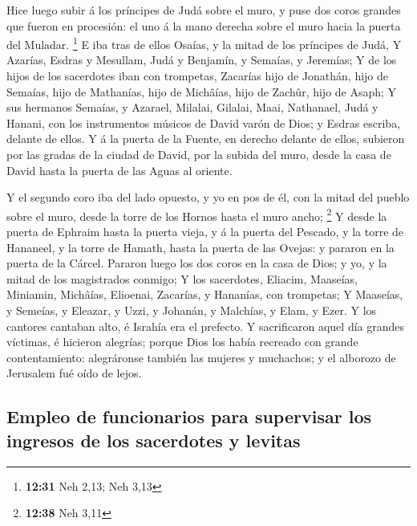  Hice luego subir á los príncipes de Judá sobre el muro,
y puse dos coros grandes que fueron en procesión: el uno á la mano
derecha sobre el muro hacia la puerta del Muladar. \footnote{\textbf{12:31}
  Neh 2,13; Neh 3,13}  E iba tras de ellos Osaías, y la
mitad de los príncipes de Judá,  Y Azarías, Esdras y
Mesullam,  Judá y Benjamín, y Semaías, y Jeremías;
 Y de los hijos de los sacerdotes iban con trompetas,
Zacarías hijo de Jonathán, hijo de Semaías, hijo de Mathanías, hijo de
Michâías, hijo de Zachûr, hijo de Asaph;  Y sus hermanos
Semaías, y Azarael, Milalai, Gilalai, Maai, Nathanael, Judá y Hanani,
con los instrumentos músicos de David varón de Dios; y Esdras escriba,
delante de ellos.  Y á la puerta de la Fuente, en derecho
delante de ellos, subieron por las gradas de la ciudad de David, por la
subida del muro, desde la casa de David hasta la puerta de las Aguas al
oriente.

 Y el segundo coro iba del lado opuesto, y yo en pos de
él, con la mitad del pueblo sobre el muro, desde la torre de los Hornos
hasta el muro ancho; \footnote{\textbf{12:38} Neh 3,11} 
Y desde la puerta de Ephraim hasta la puerta vieja, y á la puerta del
Pescado, y la torre de Hananeel, y la torre de Hamath, hasta la puerta
de las Ovejas: y pararon en la puerta de la Cárcel. 
Pararon luego los dos coros en la casa de Dios; y yo, y la mitad de los
magistrados conmigo;  Y los sacerdotes, Eliacim,
Maaseías, Miniamin, Michâías, Elioenai, Zacarías, y Hananías, con
trompetas;  Y Maaseías, y Semeías, y Eleazar, y Uzzi, y
Johanán, y Malchías, y Elam, y Ezer. Y los cantores cantaban alto, é
Israhía era el prefecto.  Y sacrificaron aquel día
grandes víctimas, é hicieron alegrías; porque Dios los había recreado
con grande contentamiento: alegráronse también las mujeres y muchachos;
y el alborozo de Jerusalem fué oído de lejos.

\hypertarget{empleo-de-funcionarios-para-supervisar-los-ingresos-de-los-sacerdotes-y-levitas}{%
\subsection{Empleo de funcionarios para supervisar los ingresos de los
sacerdotes y
levitas}\label{empleo-de-funcionarios-para-supervisar-los-ingresos-de-los-sacerdotes-y-levitas}}

